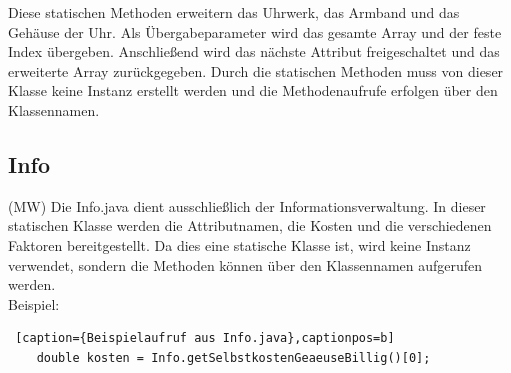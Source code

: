 Diese statischen Methoden erweitern das Uhrwerk, das Armband und das Gehäuse der Uhr. Als Übergabeparameter wird das gesamte Array und der feste Index übergeben. Anschließend wird das nächste Attribut freigeschaltet und das erweiterte Array zurückgegeben. Durch die statischen Methoden muss von dieser Klasse keine Instanz erstellt werden und die Methodenaufrufe erfolgen über den Klassennamen.

\subsection{Info}
(MW) Die Info.java dient ausschließlich der Informationsverwaltung. In dieser statischen Klasse werden die Attributnamen, die Kosten und die verschiedenen Faktoren bereitgestellt. Da dies eine statische Klasse ist, wird keine Instanz verwendet, sondern die Methoden können über den Klassennamen aufgerufen werden. \\
Beispiel:

\lstset{language=Java}
\begin{lstlisting} [caption={Beispielaufruf aus Info.java},captionpos=b]
	double kosten = Info.getSelbstkostenGeaeuseBillig()[0];
\end{lstlisting}